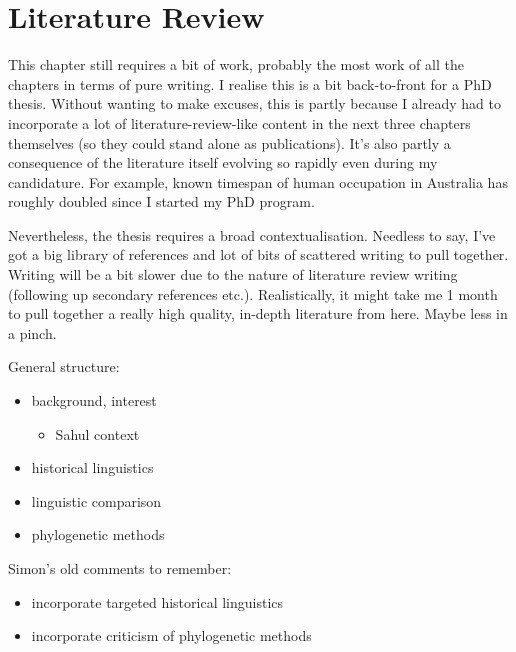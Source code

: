 \chapter[Literature review]{Literature Review}
\label{Chap:lit-review}


This chapter still requires a bit of work, probably the most work of all the chapters in terms of pure writing. I realise this is a bit back-to-front for a PhD thesis. Without wanting to make excuses, this is partly because I already had to incorporate a lot of literature-review-like content in the next three chapters themselves (so they could stand alone as publications). It's also partly a consequence of the literature itself evolving so rapidly even during my candidature. For example, known timespan of human occupation in Australia has roughly doubled since I started my PhD program.

Nevertheless, the thesis requires a broad contextualisation. Needless to say, I've got a big library of references and lot of bits of scattered writing to pull together. Writing will be a bit slower due to the nature of literature review writing (following up secondary references etc.). Realistically, it might take me 1 month to pull together a really high quality, in-depth literature from here. Maybe less in a pinch.

General structure:

\begin{itemize}
\tightlist
\item
  background, interest

  \begin{itemize}
  \tightlist
  \item
    Sahul context
  \end{itemize}
\item
  historical linguistics
\item
  linguistic comparison
\item
  phylogenetic methods
\end{itemize}

Simon's old comments to remember:

\begin{itemize}
\tightlist
\item
  incorporate targeted historical linguistics
\item
  incorporate criticism of phylogenetic methods
\end{itemize}

